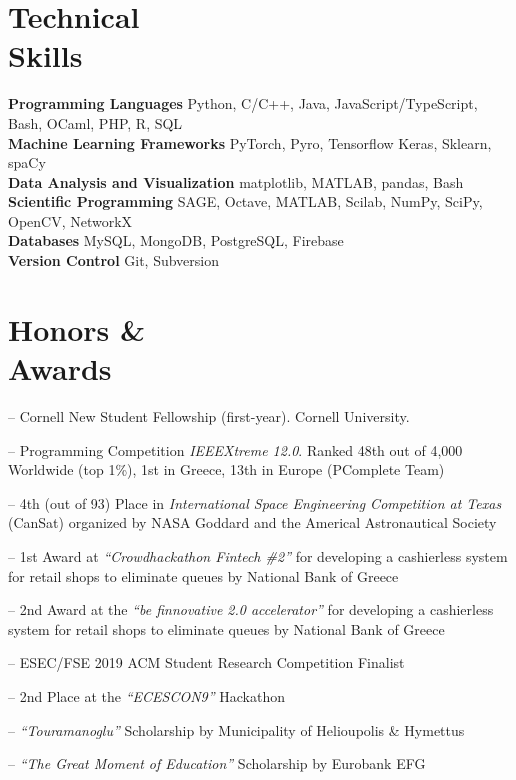 \documentclass[margin, 10pt]{res}
\newcommand{\field}[2]{\noindent \textbf{#1} \hfill #2 \\}
\begin{document}
\begin{resume}
\section{Technical \\ Skills}

\field{Programming Languages}  {Python, C/C++, Java, JavaScript/TypeScript, Bash, OCaml, PHP, R, SQL  } 
\field{Machine Learning Frameworks}  {PyTorch, Pyro, Tensorflow Keras, Sklearn, spaCy } 
\field{Data Analysis and Visualization} {matplotlib, MATLAB, pandas, Bash } 
\field{Scientific Programming} {SAGE, Octave, MATLAB, Scilab, NumPy, SciPy, OpenCV, NetworkX} 
\field{Databases} {MySQL, MongoDB, PostgreSQL, Firebase}
\field{Version Control} {Git, Subversion}
\section{Honors \& \\ Awards} 
\begin{compactitem}
	\item[--] Cornell New Student Fellowship (first-year). Cornell University. 
    \item[--] Programming Competition \emph{IEEEXtreme 12.0}. Ranked 48th out of 4,000 Worldwide (top 1\%), 1st in Greece, 13th in Europe (PComplete Team)
    \item[--] 4th (out of 93) Place in \emph{International Space Engineering  Competition at Texas} (CanSat) organized by NASA Goddard and the Americal Astronautical Society
    \item[--] 1st Award at \emph{``Crowdhackathon Fintech \#2''} for developing a cashierless system for retail shops to eliminate queues by National Bank of Greece
    \item[--] 2nd Award at the \emph{``be finnovative 2.0 accelerator''} for developing a cashierless system for retail shops to eliminate queues by National Bank of Greece
    \item[--] ESEC/FSE 2019 ACM Student Research Competition Finalist
    \item[--] 2nd Place at the \emph{``ECESCON9''} Hackathon 
    \item [--] \emph{``Touramanoglu''} Scholarship by Municipality of Helioupolis \& Hymettus
    \item [--] \emph{``The Great Moment of Education''} Scholarship by Eurobank EFG 


\end{compactitem}
\end{resume}
\end{document}
